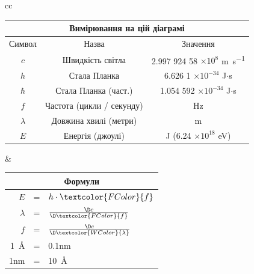 {\centering
	\begin{tabular}{cc}
		\begin{tabular}[t]{|c|c|c|}\hline
		\multicolumn{3}{|c|}{\bfseries Вимірювання на цій діаграмі}\\ \hline
		Символ & Назва & Значення\\ \hline
		\rule[0mm]{0mm}{4mm}$c$        & Швидкість світла                & 2.997 924 58 $\times 10^{8}$ \si{\metre\per\second}\\
		$h$        & Стала Планка             & 6.626 1 $\times 10^{-34}$  \si{\joule}$\cdot$\si{\second}\\
		$\hbar$    & Стала Планка (част.)      & 1.054 592 $\times 10^{-34}$  \si{\joule}$\cdot$\si{\second}\\
		\textcolor{FColor}{$f$}        & Частота (цикли / секунду) & Hz\\
		\textcolor{WColor}{$\lambda$}  & Довжина хвилі (метри)           & \si{\metre}\\
		\textcolor{EColor}{$E$}        & Енергія (джоулі)               & J (6.24 $\times 10^{18}$ \si{\electronvolt})\\
		\hline
		\end{tabular}&
		\setlength{\tabcolsep}{2pt}
		\begin{tabular}[t]{|rcl|}\hline
			\multicolumn{3}{|c|}{\bfseries Формули}\\ \hline
			\rule[0mm]{0mm}{4mm}{\textcolor{EColor}{$E$}}         &=& $h \cdot \textcolor{FColor}{f}$\rule[0.1in]{0in}{0.01in}\\
			\rule[0mm]{0mm}{4mm}{\textcolor{WColor}{$\lambda$}}   &=& $\frac{\D c}{\D \textcolor{FColor}{f}}$\rule[-0.1in]{0in}{0.15in}\\
			\rule[0mm]{0mm}{4mm}{\textcolor{FColor}{$f$}}         &=& $\frac{\D c}{\D \textcolor{WColor}{\lambda}}$\rule[-0.1in]{0in}{0.15in} \\
			\rule{0in}{0.15in}\si{1\angstrom} &=& 0.1\si{\nano\metre}\\
			\rule[0mm]{0mm}{4mm}1\si{\nano\metre}  &=& \si{10\angstrom}\\ \hline
		\end{tabular}
	\end{tabular}\\
}

%
{


}



